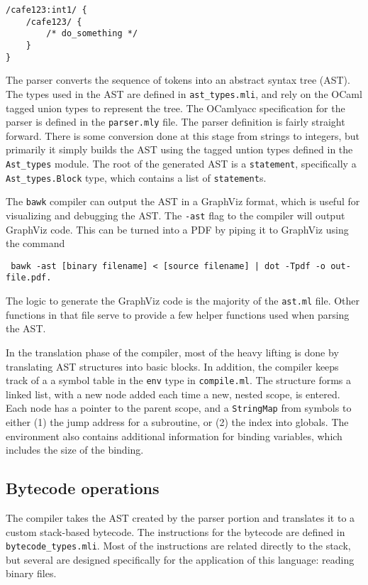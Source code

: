 \begin{lstlisting}[caption=Possibly ambiguous code]
/cafe123:int1/ {
	/cafe123/ {
		/* do_something */
	}
}
\end{lstlisting}

The parser converts the sequence of tokens into an abstract syntax tree (AST).  The types used in the AST are defined in \texttt{ast\_types.mli}, and rely on the OCaml tagged union types to represent the tree.  The OCamlyacc specification for the parser is defined in the \texttt{parser.mly} file.  The parser definition is fairly straight forward.  There is some conversion done at this stage from strings to integers, but primarily it simply builds the AST using the tagged untion types defined in the \texttt{Ast\_types} module.  The root of the generated AST is a \texttt{statement}, specifically a \texttt{Ast\_types.Block} type, which contains a list of \texttt{statement}s.

The \texttt{bawk} compiler can output the AST in a GraphViz format, which is useful for visualizing and debugging the AST.  The \texttt{-ast} flag to the compiler will output GraphViz code.  This can be turned into a PDF by piping it to GraphViz using the command
\begin{center}\tt
bawk -ast [binary filename] < [source filename] | dot -Tpdf -o out-file.pdf\rm.
\end{center}
The logic to generate the GraphViz code is the majority of the \texttt{ast.ml} file.  Other functions in that file serve to provide a few helper functions used when parsing the AST.

\bigskip
In the translation phase of the compiler, most of the heavy lifting is done by translating AST structures into basic blocks.  In addition, the compiler keeps track of a a symbol table in the \texttt{env} type in \texttt{compile.ml}.  The structure forms a linked list, with a new node added each time a new, nested scope, is entered.  Each node has a pointer to the parent scope, and a \texttt{StringMap} from symbols to either (1) the jump address for a subroutine, or (2) the index into globals.  The environment also contains additional information for binding variables, which includes the size of the binding.

\subsection{Bytecode operations}
The compiler takes the AST created by the parser portion and translates it to a custom stack-based bytecode.  The instructions for the bytecode are defined in \texttt{bytecode\_types.mli}.  Most of the instructions are related directly to the stack, but several are designed specifically for the application of this language: reading binary files.

